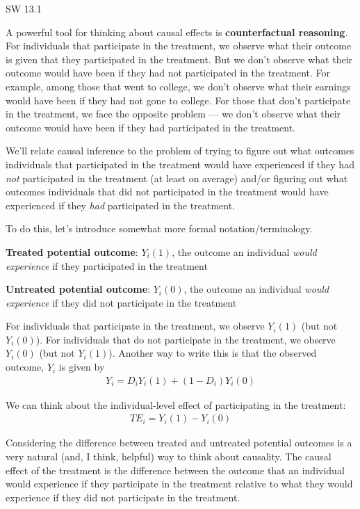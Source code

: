 \documentclass[
  letterpaper,
  DIV=11,
  numbers=noendperiod]{scrreprt}
\begin{document}
SW 13.1

A powerful tool for thinking about causal effects is
\textbf{counterfactual reasoning}. For individuals that participate in
the treatment, we observe what their outcome is given that they
participated in the treatment. But we don't observe what their outcome
would have been if they had not participated in the treatment. For
example, among those that went to college, we don't observe what their
earnings would have been if they had not gone to college. For those that
don't participate in the treatment, we face the opposite problem --- we
don't observe what their outcome would have been if they had
participated in the treatment.

We'll relate causal inference to the problem of trying to figure out
what outcomes individuals that participated in the treatment would have
experienced if they had \emph{not} participated in the treatment (at
least on average) and/or figuring out what outcomes individuals that did
not participated in the treatment would have experienced if they
\emph{had} participated in the treatment.

To do this, let's introduce somewhat more formal notation/terminology.

\textbf{Treated potential outcome}: \(Y_i(1)\), the outcome an
individual \emph{would experience} if they participated in the treatment

\textbf{Untreated potential outcome}: \(Y_i(0)\), the outcome an
individual \emph{would experience} if they did not participate in the
treatment

For individuals that participate in the treatment, we observe \(Y_i(1)\)
(but not \(Y_i(0)\)). For individuals that do not participate in the
treatment, we observe \(Y_i(0)\) (but not \(Y_i(1)\)). Another way to
write this is that the observed outcome, \(Y_i\) is given by
\begin{align*}
  Y_i = D_i Y_i(1) + (1-D_i) Y_i(0)
\end{align*}

We can think about the individual-level effect of participating in the
treatment: \begin{align*}
  TE_i = Y_i(1) - Y_i(0)
\end{align*}

Considering the difference between treated and untreated potential
outcomes is a very natural (and, I think, helpful) way to think about
causality. The causal effect of the treatment is the difference between
the outcome that an individual would experience if they participate in
the treatment relative to what they would experience if they did not
participate in the treatment.
\end{document}
